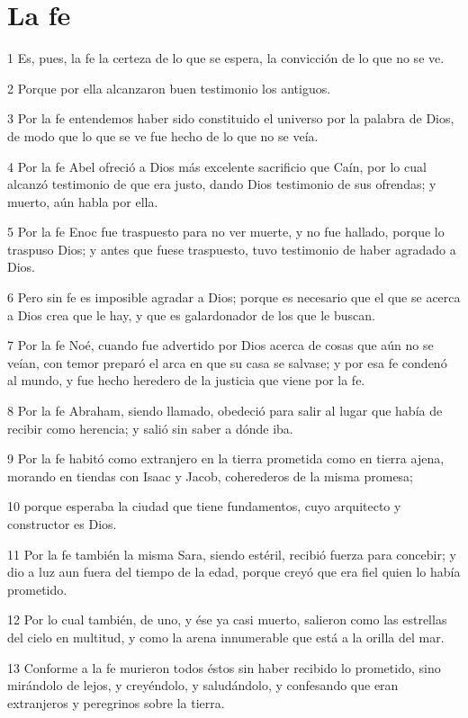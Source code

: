 \section*{La fe}

\par 1 Es, pues, la fe la certeza de lo que se espera, la convicción de lo que no se ve.
\par 2 Porque por ella alcanzaron buen testimonio los antiguos.
\par 3 Por la fe entendemos haber sido constituido el universo por la palabra de Dios, de modo que lo que se ve fue hecho de lo que no se veía.
\par 4 Por la fe Abel ofreció a Dios más excelente sacrificio que Caín, por lo cual alcanzó testimonio de que era justo, dando Dios testimonio de sus ofrendas; y muerto, aún habla por ella.
\par 5 Por la fe Enoc fue traspuesto para no ver muerte, y no fue hallado, porque lo traspuso Dios; y antes que fuese traspuesto, tuvo testimonio de haber agradado a Dios.
\par 6 Pero sin fe es imposible agradar a Dios; porque es necesario que el que se acerca a Dios crea que le hay, y que es galardonador de los que le buscan.
\par 7 Por la fe Noé, cuando fue advertido por Dios acerca de cosas que aún no se veían, con temor preparó el arca en que su casa se salvase; y por esa fe condenó al mundo, y fue hecho heredero de la justicia que viene por la fe.
\par 8 Por la fe Abraham, siendo llamado, obedeció para salir al lugar que había de recibir como herencia; y salió sin saber a dónde iba.
\par 9 Por la fe habitó como extranjero en la tierra prometida como en tierra ajena, morando en tiendas con Isaac y Jacob, coherederos de la misma promesa;
\par 10 porque esperaba la ciudad que tiene fundamentos, cuyo arquitecto y constructor es Dios.
\par 11 Por la fe también la misma Sara, siendo estéril, recibió fuerza para concebir; y dio a luz aun fuera del tiempo de la edad, porque creyó que era fiel quien lo había prometido.
\par 12 Por lo cual también, de uno, y ése ya casi muerto, salieron como las estrellas del cielo en multitud, y como la arena innumerable que está a la orilla del mar.
\par 13 Conforme a la fe murieron todos éstos sin haber recibido lo prometido, sino mirándolo de lejos, y creyéndolo, y saludándolo, y confesando que eran extranjeros y peregrinos sobre la tierra.
